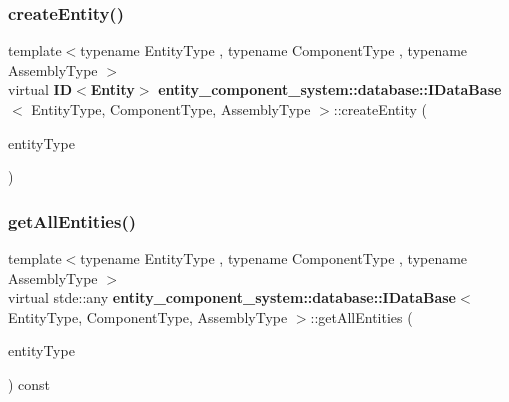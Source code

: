 \label{classentity__component__system_1_1database_1_1_i_data_base_ade6b15fec900be773f3ef01f04dc1bb2} 
\subsubsection{create\+Entity()}
{\footnotesize\ttfamily template$<$typename Entity\+Type , typename Component\+Type , typename Assembly\+Type $>$ \\
virtual {\bf ID}$<${\bf Entity}$>$ {\bf entity\+\_\+component\+\_\+system\+::database\+::\+I\+Data\+Base}$<$ Entity\+Type, Component\+Type, Assembly\+Type $>$\+::create\+Entity (\begin{DoxyParamCaption}\item[{Entity\+Type const}]{entity\+Type }\end{DoxyParamCaption})\hspace{0.3cm}{\ttfamily [pure virtual]}}

\label{classentity__component__system_1_1database_1_1_i_data_base_abad727d40380efadf24294e9ab1e5465} 
\subsubsection{get\+All\+Entities()}
{\footnotesize\ttfamily template$<$typename Entity\+Type , typename Component\+Type , typename Assembly\+Type $>$ \\
virtual stde\+::any {\bf entity\+\_\+component\+\_\+system\+::database\+::\+I\+Data\+Base}$<$ Entity\+Type, Component\+Type, Assembly\+Type $>$\+::get\+All\+Entities (\begin{DoxyParamCaption}\item[{Entity\+Type const}]{entity\+Type }\end{DoxyParamCaption}) const\hspace{0.3cm}{\ttfamily [pure virtual]}}

